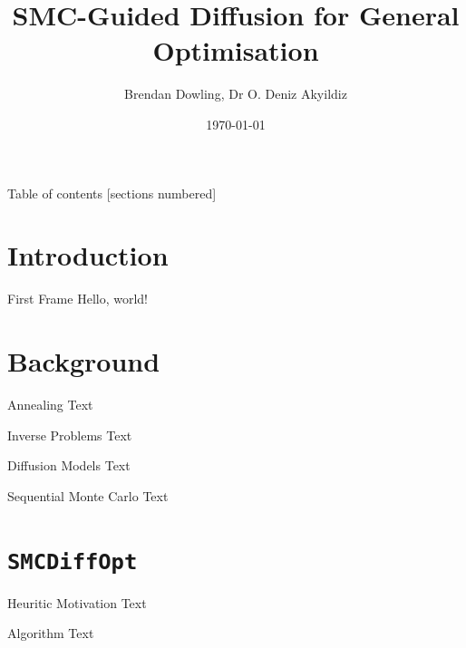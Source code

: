 \documentclass{beamer}
\title{SMC-Guided Diffusion for General Optimisation}
\date{\today}
\author{Brendan Dowling, Dr O. Deniz Akyildiz}
\institute{Imperial College London}
\begin{document}
    \maketitle

    \begin{frame}{Table of contents}
        [sections numbered]
        \tableofcontents[hideallsubsections]
    \end{frame}

    \section{Introduction}
    \begin{frame}{First Frame}
        Hello, world! \textcite{andersonReversetimeDiffusionEquation1982,hoDenoisingDiffusionProbabilistic2020,douDiffusionPosteriorSampling2023,akyildizParallelSequentialMonte2020,delmoralCentralLimitTheorems2011}
    \end{frame}

    \section{Background}

    \begin{frame}{Annealing}
        Text
    \end{frame}

    \begin{frame}{Inverse Problems}
        Text
    \end{frame}

    \begin{frame}{Diffusion Models}
        Text
    \end{frame}

    \begin{frame}{Sequential Monte Carlo}
        Text
    \end{frame}

    \section{\texttt{SMCDiffOpt}}

    \begin{frame}{Heuritic Motivation}
        Text
    \end{frame}

    \begin{frame}{Algorithm}
        Text
    \end{frame}
\end{document}
